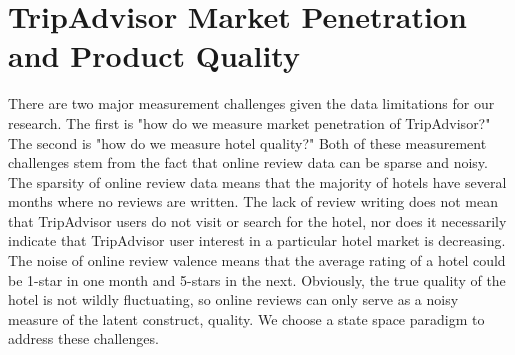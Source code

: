 \documentclass[mksc,blindrev]{informs3} %
\begin{document}

\section*{TripAdvisor Market Penetration and Product Quality} \label{sec:crosssection}

There are two major measurement challenges given the data limitations for our research. The first is "how do we measure market penetration of TripAdvisor?" The second is "how do we measure hotel quality?" Both of these measurement challenges stem from the fact that online review data can be sparse and noisy. The sparsity of online review data means that the majority of hotels have several months where no reviews are written. The lack of review writing does not mean that TripAdvisor users do not visit or search for the hotel, nor does it necessarily indicate that TripAdvisor user interest in a particular hotel market is decreasing. The noise of online review valence means that the average rating of a hotel could be 1-star in one month and 5-stars in the next. Obviously, the true quality of the hotel is not wildly fluctuating, so online reviews can only serve as a noisy measure of the latent construct, quality. We choose a state space paradigm to address these challenges. 
\end{document}
